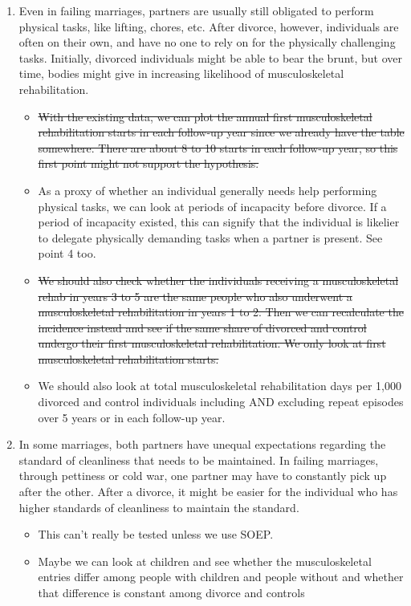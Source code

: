 \documentclass[a4paper,12pt]{article}
\theoremstyle{plain}
\theoremstyle{definition}
\theoremstyle{TheoremNum}
\theoremstyle{CorollaryNum}
\theoremstyle{PropositionNum}
\theoremstyle{TheoremNum}
\begin{document}
{\begin{enumerate}
    \item Even in failing marriages, partners are usually still obligated to perform physical tasks, like lifting, chores, etc. After divorce, however, individuals are often on their own, and have no one to rely on for the physically challenging tasks. Initially, divorced individuals might be able to bear the brunt, but over time, bodies might give in increasing likelihood of musculoskeletal rehabilitation.
    \begin{itemize}
        \item[DONE] \st{With the existing data, we can plot the annual first musculoskeletal rehabilitation starts in each follow-up year since we already have the table somewhere. There are about 8 to 10 starts in each follow-up year, so this first point might not support the hypothesis.}
        \item As a proxy of whether an individual generally needs help performing physical tasks, we can look at periods of incapacity before divorce. If a period of incapacity existed, this can signify that the individual is likelier to delegate physically demanding tasks when a partner is present. See point 4 too.
        \item[DONE] \st{We should also check whether the individuals receiving a musculoskeletal rehab in years 3 to 5 are the same people who also underwent a musculoskeletal rehabilitation in years 1 to 2. Then we can recalculate the incidence instead and see if the same share of divorced and control undergo their first musculoskeletal rehabilitation. We only look at first musculoskeletal rehabilitation starts.}
        \item We should also look at total musculoskeletal rehabilitation days per 1,000 divorced and control individuals including AND excluding repeat episodes over 5 years or in each follow-up year. 
    \end{itemize}
    \item In some marriages, both partners have unequal expectations regarding the standard of cleanliness that needs to be maintained. In failing marriages, through pettiness or cold war, one partner may have to constantly pick up after the other. After a divorce, it might be easier for the individual who has higher standards of cleanliness to maintain the standard. 
    \begin{itemize}
        \item This can't really be tested unless we use SOEP.
        \item Maybe we can look at children and see whether the musculoskeletal entries differ among people with children and people without and whether that difference is constant among divorce and controls

\end{itemize}
\end{enumerate}}
\end{document}
